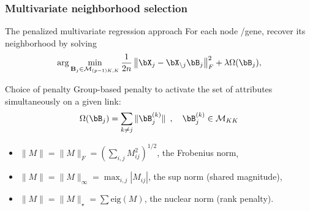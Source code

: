 \begin{frame}
  \frametitle{Multivariate neighborhood selection} 

  \begin{block}{The penalized multivariate regression approach}
    For each node /gene, recover its neighborhood by solving 
    \begin{equation*}
      \arg  \min_{\mathbf{B}_j  \in  \mathcal{M}_{(p-1)K,K}}  \frac{1}{2n} \left\|
        \bX_j - \bX_{\backslash j}\bB_j\right\|_F^2 +
      \lambda \Omega(\bB_j),
    \end{equation*}
  \end{block}
  
  \vfill
  
  \begin{block}{Choice of penalty}
    Group-based   penalty   to   activate  the   set   of   attributes
    simultaneously on a given link:
    \begin{equation*}
      \Omega(\bB_j) =       \sum_{k \neq j}  \|\bB_j^{(k)}\|  \enskip  ,
      \quad \bB_j^{(k)} \in \mathcal{M}_{KK}
    \end{equation*}
    \begin{itemize}
    \item  \alert{$\|M\|=   \|M\|_F=\left(  \sum_{i,j}  M_{ij}^2\right)^{1/2}$,
        the Frobenius norm},
    \item  $\|M\|=  \|M\|_\infty=  \max_{i,j}{|M_{ij}|}$, the  sup  norm
      (shared magnitude),
    \item $\|M\|= \|M\|_\star=\sum \mathrm{eig}(M)$, the nuclear norm
      (rank penalty).
    \end{itemize}      
  \end{block}
\end{frame}

